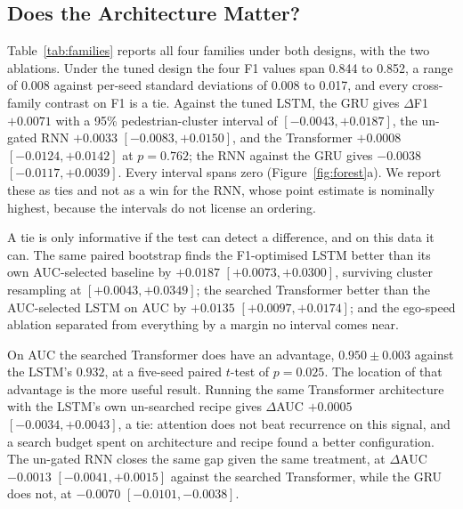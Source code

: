 \documentclass[mti,article,submit,moreauthors]{Definitions/mdpi}
\begin{document}
\subsection{Does the Architecture Matter?}
\label{sec:architecture}

Table~\ref{tab:families} reports all four families under both designs, with the two ablations. Under the tuned design the four F1 values span 0.844 to 0.852, a range of 0.008 against per-seed standard deviations of 0.008 to 0.017, and every cross-family contrast on F1 is a tie. Against the tuned LSTM, the GRU gives $\Delta$F1 $+0.0071$ with a 95\% pedestrian-cluster interval of $[-0.0043, +0.0187]$, the un-gated RNN $+0.0033$ $[-0.0083, +0.0150]$, and the Transformer $+0.0008$ $[-0.0124, +0.0142]$ at $p = 0.762$; the RNN against the GRU gives $-0.0038$ $[-0.0117, +0.0039]$. Every interval spans zero (Figure~\ref{fig:forest}a). We report these as ties and not as a win for the RNN, whose point estimate is nominally highest, because the intervals do not license an ordering.

A tie is only informative if the test can detect a difference, and on this data it can. The same paired bootstrap finds the F1-optimised LSTM better than its own AUC-selected baseline by $+0.0187$ $[+0.0073, +0.0300]$, surviving cluster resampling at $[+0.0043, +0.0349]$; the searched Transformer better than the AUC-selected LSTM on AUC by $+0.0135$ $[+0.0097, +0.0174]$; and the ego-speed ablation separated from everything by a margin no interval comes near.

On AUC the searched Transformer does have an advantage, $0.950 \pm 0.003$ against the LSTM's $0.932$, at a five-seed paired $t$-test of $p = 0.025$. The location of that advantage is the more useful result. Running the same Transformer architecture with the LSTM's own un-searched recipe gives $\Delta$AUC $+0.0005$ $[-0.0034, +0.0043]$, a tie: attention does not beat recurrence on this signal, and a search budget spent on architecture and recipe found a better configuration. The un-gated RNN closes the same gap given the same treatment, at $\Delta$AUC $-0.0013$ $[-0.0041, +0.0015]$ against the searched Transformer, while the GRU does not, at $-0.0070$ $[-0.0101, -0.0038]$.
\end{document}
